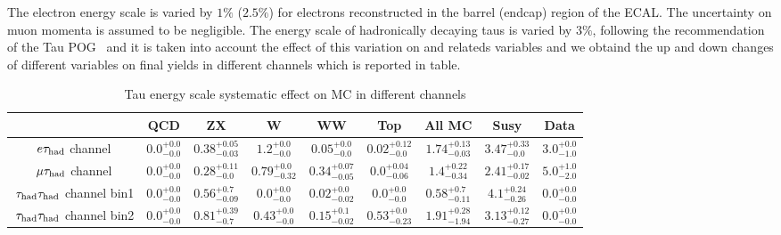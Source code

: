 The electron energy scale is varied by $1\%$ ($2.5\%$) for electrons reconstructed in the barrel (endcap) region of the ECAL.
The uncertainty on muon momenta is assumed to be negligible. The energy scale of hadronically decaying taus is varied by $3\%$, following the recommendation of the Tau POG~\cite{TauPOG} and it is taken into account the effect of this variation on \MET and \pt relateds variables and we obtaind the up and down changes of different variables on final yields in different channels which is reported in table.



\begin{table}[!h]
\tiny{
\begin{center}
\begin{tabular}{|c|c|c|c|c|c|c|c|c|}
\hline
                             & QCD & ZX    & W  & WW   & Top    & All MC & Susy & Data \\\hline 
$e\tau_{\rm had}$ channel           & $0.0 ^{+0.0} _{-0.0} $ & $0.38 ^{+0.05} _{-0.03}  $    &  $1.2 ^{+0.0} _{-0.0} $      &  $0.05 ^{+0.0} _{-0.0} $   &$0.02 ^{+0.12} _{-0.0} $           & $1.74 ^{+0.13} _{-0.03} $       & $3.47 ^{+0.33} _{-0.0} $ & $3.0 ^{+0.0} _{-1.0}$    \\\hline   

$\mu\tau_{\rm had}$ channel &  $0.0 ^{+0.0} _{-0.0} $     &  $0.28 ^{+0.11} _{-0.0} $      &  $0.79 ^{+0.0} _{-0.32} $  & $0.34 ^{+0.07} _{-0.05} $        &  $0.0 ^{+0.04} _{-0.06} $   &    $1.4 ^{+0.22} _{-0.34} $      &  $2.41 ^{+0.17} _{-0.02} $      & $5.0 ^{+1.0} _{-2.0} $     \\\hline  

$\,\tau_{\rm had}\tau_{\rm had}$ channel bin1 &  $0.0 ^{+0.0} _{-0.0}$   &    $0.56 ^{+0.7} _{-0.09}$    &  $0.0 ^{+0.0} _{-0.0}$      &  $0.02 ^{+0.0} _{-0.02}$        &   $0.0 ^{+0.0} _{-0.0}$        &    $0.58 ^{+0.7} _{-0.11}$     & $4.1^{+0.24} _{-0.26} $    & $0.0 ^{+0.0} _{-0.0}$\\\hline

$\,\tau_{\rm had}\tau_{\rm had}$ channel bin2 &  $0.0 ^{+0.0} _{-0.0}$   &     $0.81 ^{+0.39} _{-0.7}$     &    $0.43 ^{+0.0} _{-0.0}$     &     $0.15 ^{+0.1} _{-0.02}$     &   $0.53 ^{+0.0} _{-0.23}$   &      $1.91 ^{+0.28} _{-1.94}$     &     $3.13 ^{+0.12} _{-0.27}$   &  $0.0 ^{+0.0} _{-0.0}$    \\\hline
\end{tabular} 
\end{center}
\caption{Tau energy scale systematic effect on MC in different channels}
\label{Tab.susyHiggs}

}
\end{table}     


